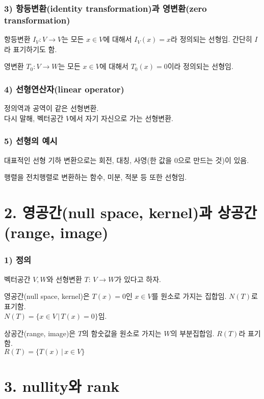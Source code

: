 \subsubsection*{3) 항등변환(identity transformation)과 영변환(zero transformation)}
항등변환 $I_V : V \rightarrow V$는 모든 $x \in V$에 대해서 $I_V(x)=x$라 정의되는 선형임. 간단히 $I$라 표기하기도 함.

영변환 $T_0 : V \rightarrow W$는 모든 $x \in V$에 대해서 $T_0(x)=0$이라 정의되는 선형임.

\subsubsection*{4) 선형연산자(linear operator)}
정의역과 공역이 같은 선형변환.\\
다시 말해, 벡터공간 $V$에서 자기 자신으로 가는 선형변환.

\subsubsection*{5) 선형의 예시}
대표적인 선형 기하 변환으로는 회전, 대칭, 사영(한 값을 0으로 만드는 것)이 있음.

행렬을 전치행렬로 변환하는 함수, 미분, 적분 등 또한 선형임.\\


\newpage


\section*{2. 영공간(null space, kernel)과 상공간(range, image)}

\subsubsection*{1) 정의\\}
\begin{DEF}
벡터공간 $V, W$와 선형변환 $T:\,V \rightarrow W$가 있다고 하자.

영공간(null space, kernel)은 $T(x)=0$인 $x \in V$를 원소로 가지는 집합임. $N(T)$로 표기함.\\$N(T)=\{x \in V\,|\,T(x)=0\}$임.

상공간(range, image)은 $T$의 함숫값을 원소로 가지는 $W$의 부분집합임. $R(T)$라 표기함.\\$R(T)=\{T(x)\,|\,x \in V\}$
\end{DEF}

\section*{3. nullity와 rank}
